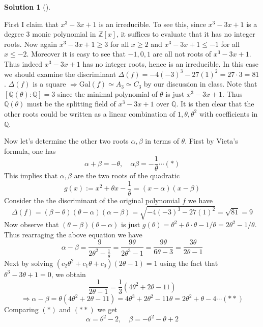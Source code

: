 \documentclass{article}
\theoremstyle{definition}
\newtheorem*{sol}{Solution}
\newenvironment{sols}[1][]{%
  \begin{sol}[#1]$ $\par\nobreak\ignorespaces
}{%
  \end{sol}
}
\newcommand{\QQ}{\mathbb Q}
\newcommand{\ZZ}{\mathbb Z}
\newcommand{\Ra}{\Rightarrow}
\newcommand{\Gal}{\text{Gal}}
\begin{document}
\begin{sols}
	First I claim that $x^3 - 3x + 1$ is an irreducible.
	To see this, since $x^3 - 3x + 1$ is a degree 3 monic polynomial in $\ZZ[x]$, it suffices to evaluate that it has no integer roots.
	Now again $x^3 - 3x + 1 \geq 3$ for all $x \geq 2$ and $x^3 - 3x + 1 \leq -1$ for all $x \leq -2$.
	Moreover it is easy to see that $-1, 0, 1$ are all not roots of $x^3 - 3x + 1$.
	Thus indeed $x^3 - 3x + 1$ has no integer roots, hence is an irreducible.
	In this case we should examine the discriminant $\Delta(f) = -4 (-3)^3 - 27 (1)^2 = 27 \cdot 3 = 81$.
	$\Delta(f)$ is a square $\Ra \Gal(f) \simeq A_3 \simeq C_3$ by our discussion in class.
	Note that $[\QQ(\theta):\QQ] = 3$ since the minimal polynomial of $\theta$ is just $x^3 - 3x + 1$.
	Thus $\QQ(\theta)$ must be the splitting field of $x^3 - 3x + 1$ over $\QQ$.
	It is then clear that the other roots could be written as a linear combination of $1, \theta, \theta^2$ with coefficients in $\QQ$.

	\par Now let's determine the other two roots $\alpha, \beta$ in terms of $\theta$.
	First by Vieta's formula, one has
	\[
		\alpha + \beta = - \theta, \quad \alpha \beta = -\frac{1}{\theta} \cdots (*)
	\]
	This implies that $\alpha, \beta$ are the two roots of the quadratic 
	\[
		g(x) := x^2 + \theta x - \frac{1}{\theta} = (x - \alpha) (x - \beta) 
	\]
	Consider the the discriminant of the original polynomial $f$ we have
	\[
		\Delta(f) = (\beta - \theta) (\theta - \alpha) (\alpha - \beta) = \sqrt{ -4 (-3)^3 - 27 (1)^2} = \sqrt{81} = 9
	\]
	Now observe that $(\theta - \beta) (\theta - \alpha)$ is just $g(\theta) = \theta^2 + \theta \cdot \theta - 1/\theta = 2 \theta^2 - 1/\theta$.
	Thus rearraging the above equation we have
	\[
		\alpha - \beta = \frac{9}{2 \theta^2 - \frac{1}{\theta}} = \frac{9 \theta}{2 \theta^3 - 1} = \frac{9 \theta}{6 \theta - 3} = \frac{3 \theta}{2 \theta - 1}
	\]
	Next by solving $(c_2 \theta^2 + c_1 \theta+ c_0)(2 \theta - 1) = 1$ using the fact that $\theta^3 - 3 \theta + 1 = 0$, we obtain 
	\[
		\frac{1}{2 \theta - 1} = \frac{1}{3} (4 \theta^2 + 2 \theta - 11) 
	\]
	\[
		\Ra \alpha - \beta = \theta (4 \theta^2 + 2 \theta - 11) = 4 \theta^3 + 2 \theta^2 - 11 \theta = 2 \theta^2 + \theta - 4 \cdots (**)
	\]
	Comparing $(*)$ and $(**)$ we get
	\[
		\alpha = \theta^2 - 2, \quad \beta = - \theta^2 - \theta + 2
	\]
\end{sols}
\end{document}
